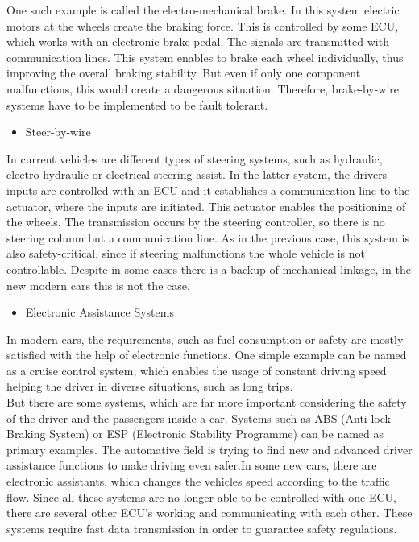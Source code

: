 \documentclass[conference]{IEEEtran}
\begin{document}
One such example is called the electro-mechanical brake. In this system electric motors at the wheels create the braking force. This is controlled by some ECU, which works with an electronic brake pedal. The signals are transmitted with communication lines. This system enables to brake each wheel individually, thus improving the overall braking stability. But even if only one component malfunctions, this would create a dangerous situation. Therefore, brake-by-wire systems have to be implemented to be fault tolerant.\\

\begin{itemize}
  \item Steer-by-wire
\end{itemize}

In current vehicles are different types of steering systems, such as hydraulic, electro-hydraulic or electrical steering assist. In the latter system, the drivers inputs are controlled with an ECU and it establishes a communication line to the actuator, where the inputs are initiated. This actuator enables the positioning of the wheels. The transmission occurs by the steering controller, so there is no steering column but a communication line. As in the previous case, this system is also safety-critical, since if steering malfunctions the whole vehicle is not controllable. Despite in some cases there is a backup of mechanical linkage, in the new modern cars this is not the case.\\

\begin{itemize}
  \item Electronic Assistance Systems
\end{itemize}

In modern cars, the requirements, such as fuel consumption or safety are mostly satisfied with the help of electronic functions. One simple example can be named as a cruise control system, which enables the usage of constant driving speed helping the driver in diverse situations, such as long trips.\\

But there are some systems, which are far more important considering the safety of the driver and the passengers inside a car. Systems such as ABS (Anti-lock Braking System) or ESP (Electronic Stability Programme) can be named as primary examples. The automative field is trying to find new and advanced driver assistance functions to make driving even safer.In some new cars, there are electronic assistants, which changes the vehicles speed according to the traffic flow. Since all these systems are no longer able to be controlled with one ECU, there are several other ECU's working and communicating with each other. These systems require fast data transmission in order to guarantee safety regulations.
\end{document}
